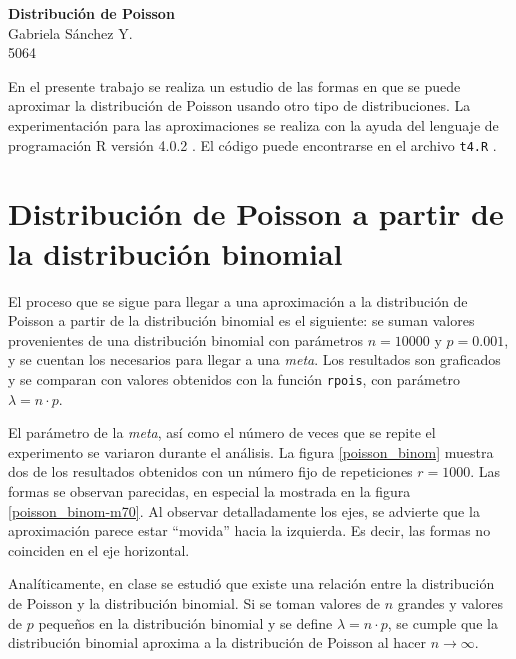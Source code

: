 \documentclass[12pt]{article}
\begin{document}
	\thispagestyle{empty}

	\begin{center}
		{\Large \bf Distribución de Poisson}\\
		Gabriela S\'anchez Y.\\
		5064
	\end{center}
 
	En el presente trabajo se realiza un estudio de las formas en que se puede aproximar la distribución de Poisson usando otro tipo de distribuciones. La experimentación para las aproximaciones se realiza con la ayuda del lenguaje de programación \textsc{R} versión 4.0.2 \cite{r}. El código puede encontrarse en el archivo \texttt{t4.R} \cite{mpa_gaby}.

	

	\section{Distribución de Poisson a partir de la distribución binomial}
	
	El proceso que se sigue para llegar a una aproximación a la distribución de Poisson a partir de la distribución binomial es el siguiente: se suman valores provenientes de una distribución binomial con parámetros  $n=10000$ y $p=0.001$, y se cuentan los necesarios para llegar a una {\em meta}. Los resultados son graficados y se comparan con valores obtenidos con la función  \texttt{rpois}, con parámetro $\lambda = n\cdot p$.
	
	El parámetro de la {\em meta}, así como el número de veces que se repite el experimento se variaron durante el análisis. La figura \ref{poisson_binom} muestra dos de los resultados obtenidos con un número fijo de repeticiones $r=1000$. Las formas se observan parecidas, en especial la mostrada en la figura \ref{poisson_binom-m70}. Al observar detalladamente los ejes, se advierte que la aproximación parece estar ``movida'' hacia la izquierda. Es decir, las formas no coinciden en el eje horizontal. 
	
	Analíticamente, en clase se estudió que existe una relación entre la distribución de Poisson y la distribución binomial. Si se toman valores de $n$ grandes y valores de $p$ pequeños en la distribución binomial y se define $\lambda = n\cdot p$, se cumple que la distribución binomial aproxima a la distribución de Poisson al hacer $n \rightarrow \infty$.
	
\end{document}
